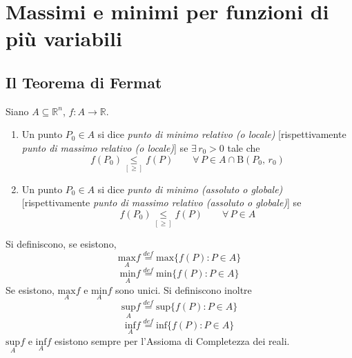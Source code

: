 \graphicspath{{02_massimi_e_minimi/figures/PNG/}{02_massimi_e_minimi/figures/PDF/}{02_massimi_e_minimi/figures/}}

\chapter{Massimi e minimi per funzioni di più variabili}
\copyrightnotice
\section{Il Teorema di Fermat}
\begin{definition}
Siano $A \subseteq \mathbb{R}^n$, $f : A \longrightarrow \mathbb{R}$.
\begin{enumerate}[labelindent=\parindent,leftmargin=*,label=\textnormal{(\roman*)},start=1]
\item Un punto $P_0 \in A$ si dice \emph{punto di minimo relativo (o locale)} [rispettivamente \emph{punto di massimo relativo (o locale)}] se $\exists \, r_0 > 0$ tale che
$$
f(P_0) \underset{[\geq]}{\leq} f(P) \qquad \forall \, P \in A \cap \mathrm{B}(P_0,\,r_0)
$$
\item Un punto $P_0 \in A$ si dice \emph{punto di minimo (assoluto o globale)} [rispettivamente \emph{punto di massimo relativo (assoluto o globale)}] se
$$
f(P_0) \underset{[\geq]}{\leq} f(P) \qquad \forall \, P \in A
$$
\end{enumerate}
Si definiscono, se esistono,
$$
\underset{A}{\mathrm{max}}f \overset{def}{=} \mathrm{max} \lbrace f(P) : P \in A \rbrace
$$
$$
\underset{A}{\mathrm{min}}f \overset{def}{=} \mathrm{min} \lbrace f(P) : P \in A \rbrace
$$
Se esistono, $\underset{A}{\mathrm{max}}f$ e $\underset{A}{\mathrm{min}}f$ sono unici. Si definiscono inoltre
$$
\underset{A}{\mathrm{sup}}f \overset{def}{=} \mathrm{sup} \lbrace f(P) : P \in A \rbrace
$$
$$
\underset{A}{\mathrm{inf}}f \overset{def}{=} \mathrm{inf} \lbrace f(P) : P \in A \rbrace
$$
$\underset{A}{\mathrm{sup}}f$ e $\underset{A}{\mathrm{inf}}f$ esistono sempre per l'Assioma di Completezza dei reali.
\end{definition}

